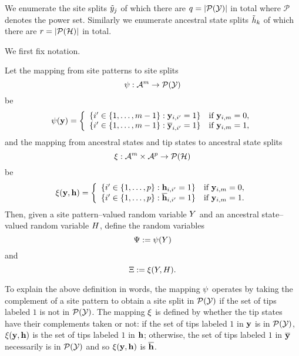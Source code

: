 We enumerate the site splits $\tilde{y}_j$ of which there are $q=|\mathcal{P}(\mathcal{Y})|$ in total where $\mathcal{P}$ denotes the power set.
Similarly we enumerate ancestral state splits $\tilde{h}_k$ of which there are $r=|\mathcal{P}(\mathcal{H})|$ in total.

We first fix notation.
\begin{definition}
Let the mapping from site patterns to site splits
\[
\psi:\mathcal{A}^m\rightarrow\mathcal{P}(\mathcal{Y})
\]
be
\[
\psi(\mathbf{y}) =
\left\{
    \begin{array}{ll}
        \{i'\in\{1,\ldots,m-1\}: \mathbf{y}_{i,i'}=1\}  & \mbox{if } \mathbf{y}_{i,m}=0,\\
        \{i'\in\{1,\ldots,m-1\}: \overline{\mathbf{y}}_{i,i'}=1\}  & \mbox{if } \mathbf{y}_{i,m}=1,
    \end{array}
\right.
\]
and the mapping from ancestral states and tip states to ancestral state splits
\[
\xi:\mathcal{A}^m\times\mathcal{A}^p\rightarrow\mathcal{P}(\mathcal{H})
\]
be
\[
\xi(\mathbf{y}, \mathbf{h}) =
\left\{
    \begin{array}{ll}
        \{i'\in\{1,\ldots,p\}: \mathbf{h}_{i,i'}=1\}  & \mbox{if } \mathbf{y}_{i,m}=0,\\
        \{i'\in\{1,\ldots,p\}: \overline{\mathbf{h}}_{i,i'}=1\}  & \mbox{if } \mathbf{y}_{i,m}=1.
    \end{array}
\right.
\]
Then, given a site pattern--valued random variable $Y$ and an ancestral state--valued random variable $H$, define the random variables
\[
\Psi := \psi(Y)
\]
and
\[
\Xi := \xi(Y, H).
\]
\end{definition}
To explain the above definition in words, the mapping $\psi$ operates by taking the complement of a site pattern to obtain a site split in $\mathcal{P}(\mathcal{Y})$ if the set of tips labeled $1$ is not in $\mathcal{P}(\mathcal{Y})$.
The mapping $\xi$ is defined by whether the tip states have their complements taken or not: if the set of tips labeled $1$ in $\mathbf{y}$ is in $\mathcal{P}(\mathcal{Y})$, $\xi(\mathbf{y}, \mathbf{h})$ is the set of tips labeled $1$ in $\mathbf{h}$; otherwise, the set of tips labeled $1$ in $\overline{\mathbf{y}}$ necessarily is in $\mathcal{P}(\mathcal{Y})$ and so $\xi(\mathbf{y}, \mathbf{h})$ is $\overline{\mathbf{h}}$.

